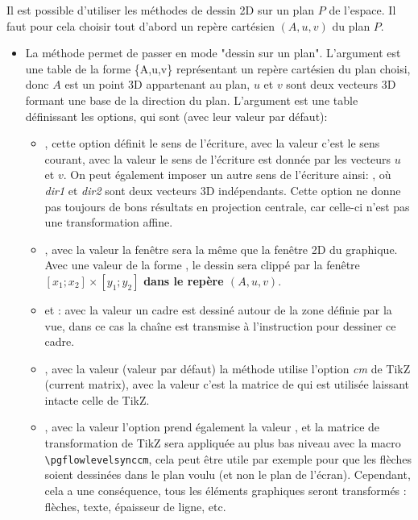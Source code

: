 Il est possible d'utiliser les méthodes de dessin 2D sur un plan $P$ de l'espace. Il faut pour cela choisir tout d'abord un repère cartésien $(A,u,v)$ du plan $P$.
\begin{itemize}
    \item La méthode  permet de passer en mode "dessin sur un plan". L'argument  est une table de la forme \{A,u,v\} représentant un repère cartésien du plan choisi, donc $A$ est un point 3D appartenant au plan, $u$ et $v$ sont deux vecteurs 3D formant une base de la direction du plan. L'argument  est une table définissant les options, qui sont (avec leur valeur par défaut):
        \begin{itemize}
            \item {}, cette option définit le sens de l'écriture, avec la valeur \nil c'est le sens courant, avec la valeur  le sens de l'écriture est donnée par les vecteurs $u$ et $v$. On peut également imposer un autre sens de l'écriture ainsi: , où \emph{dir1} et \emph{dir2} sont deux vecteurs 3D indépendants.
            Cette option ne donne pas toujours de bons résultats en projection centrale, car celle-ci n'est pas une transformation affine.
            
            \item {}, avec la valeur \nil la fenêtre sera la même que la fenêtre 2D du graphique. Avec une valeur de la forme , le dessin sera clippé par la fenêtre $[x_1;x_2]\times[y_1;y_2]$ \textbf{dans le repère $(A,u,v)$}.
            
            \item {} et  : avec la valeur \true un cadre est dessiné autour de la zone définie par la vue, dans ce cas la chaîne  est transmise à l'instruction \drawcmd pour dessiner ce cadre.
            
            \item {}, avec la valeur \true (valeur par défaut) la méthode utilise l'option \emph{cm} de TikZ (current matrix), avec la valeur \false c'est la matrice de \luadrawenv qui est utilisée laissant intacte celle de TikZ.
            
            \item {}, avec la valeur \true l'option  prend également la valeur \true, et la matrice de transformation de TikZ sera appliquée au plus bas niveau avec la macro \verb|\pgflowlevelsynccm|, cela peut être utile par exemple pour que les flèches soient dessinées dans le plan voulu (et non le plan de l'écran). Cependant, cela a une conséquence, tous les éléments graphiques seront transformés : flèches, texte, épaisseur de ligne, etc.
            

\end{itemize}
\end{itemize}
